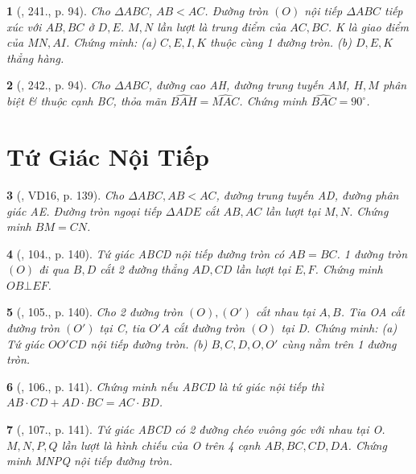 \documentclass{article}
\newtheorem{baitoan}{}
\begin{document}
\begin{baitoan}[\cite{Binh_Toan_9_tap_2}, 241., p. 94]
	Cho $\Delta ABC$, $AB < AC$. Đường tròn $(O)$ nội tiếp $\Delta ABC$ tiếp xúc với $AB,BC$ ở $D,E$. $M,N$ lần lượt là trung điểm của $AC,BC$. K là giao điểm của $MN,AI$. Chứng minh: (a) $C,E,I,K$ thuộc cùng 1 đường tròn. (b) $D,E,K$ thẳng hàng.
\end{baitoan}

\begin{baitoan}[\cite{Binh_Toan_9_tap_2}, 242., p. 94]
	Cho $\Delta ABC$, đường cao AH, đường trung tuyến AM, $H,M$ phân biệt \& thuộc cạnh BC, thỏa mãn $\widehat{BAH} = \widehat{MAC}$. Chứng minh $\widehat{BAC} = 90^\circ$.
\end{baitoan}


\section{Tứ Giác Nội Tiếp}

\begin{baitoan}[\cite{Tuyen_Toan_9_old}, VD16, p. 139]
	Cho $\Delta ABC,AB < AC$, đường trung tuyến AD, đường phân giác AE. Đường tròn ngoại tiếp $\Delta ADE$ cắt $AB,AC$ lần lượt tại $M,N$. Chứng minh $BM = CN$.
\end{baitoan}

\begin{baitoan}[\cite{Tuyen_Toan_9_old}, 104., p. 140]
	Tứ giác ABCD nội tiếp đường tròn có $AB = BC$. 1 đường tròn $(O)$ đi qua $B,D$ cắt 2 đường thẳng $AD,CD$ lần lượt tại $E,F$. Chứng minh $OB\bot EF$.
\end{baitoan}

\begin{baitoan}[\cite{Tuyen_Toan_9_old}, 105., p. 140]
	Cho 2 đường tròn $(O),(O')$ cắt nhau tại $A,B$. Tia OA cắt đường tròn $(O')$ tại C, tia $O'A$ cắt đường tròn $(O)$ tại D. Chứng minh: (a) Tứ giác $OO'CD$ nội tiếp đường tròn. (b) $B,C,D,O,O'$ cùng nằm trên 1 đường tròn.
\end{baitoan}

\begin{baitoan}[\cite{Tuyen_Toan_9_old}, 106., p. 141]
	Chứng minh nếu ABCD là tứ giác nội tiếp thì $AB\cdot CD + AD\cdot BC = AC\cdot BD$.
\end{baitoan}

\begin{baitoan}[\cite{Tuyen_Toan_9_old}, 107., p. 141]
	Tứ giác ABCD có 2 đường chéo vuông góc với nhau tại O. $M,N,P,Q$ lần lượt là hình chiếu của O trên 4 cạnh $AB,BC,CD,DA$. Chứng minh MNPQ nội tiếp đường tròn.
\end{baitoan}
\end{document}
